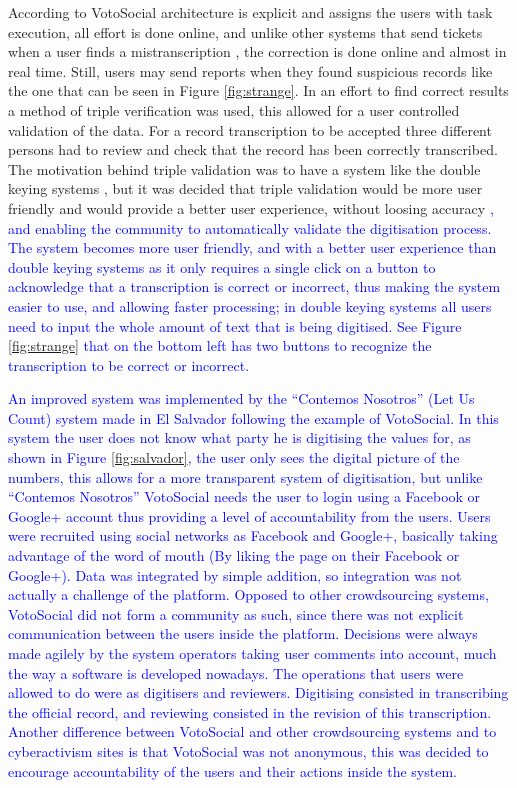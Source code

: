 \documentclass[letterpaper,10pt]{article}
\begin{document}
According to \cite{doan2011} VotoSocial architecture is explicit and assigns the users with task execution, all effort is done online, and unlike other systems that send tickets when a user finds a mistranscription \citep{haaf2013}, the correction is done online and almost in real time. Still, users may send reports when they found suspicious records like the one that can be seen in Figure \ref{fig:strange}. In an effort to find correct results a method of triple verification was used, this allowed for a user controlled validation of the data. For a record transcription to be accepted three different persons had to review and check that the record has been correctly transcribed. The motivation behind triple validation was to have a system like the double keying systems \citep{haaf2013}, but it was decided that triple validation would be more user friendly and would provide a better user experience, without loosing accuracy \textcolor{blue}{, and enabling the community to automatically validate the digitisation process. The system becomes more user friendly, and with a better user experience than double keying systems as it only requires a single click on a button to acknowledge that a transcription is correct or incorrect, thus making the system easier to use, and allowing faster processing; in double keying systems all users need to input the whole amount of text that is being digitised. See Figure \ref{fig:strange} that on the bottom left has two buttons to recognize the transcription to be correct or incorrect.}

\textcolor{blue}{An improved system was implemented by the ``Contemos Nosotros'' (Let Us Count) \citep{contemosnosotros} system made in El Salvador following the example of VotoSocial. In this system the user does not know what party he is digitising the values for, as shown in Figure \ref{fig:salvador}, the user only sees the digital picture of the numbers, this allows for a more transparent system of digitisation, but unlike ``Contemos Nosotros'' VotoSocial needs the user to login using a Facebook or Google+ account thus providing a level of accountability from the users. Users were recruited using social networks as Facebook and Google+, basically taking advantage of the word of mouth (By liking the page on their Facebook or Google+). Data was integrated by simple addition, so integration was not actually a challenge of the platform. Opposed to other crowdsourcing systems, VotoSocial did not form a community as such, since there was not explicit communication between the users inside the platform. Decisions were always made agilely by the system operators taking user comments into account, much the way a software is developed nowadays. The operations that users were allowed to do were as digitisers and reviewers. Digitising consisted in transcribing the official record, and reviewing consisted in the revision of this transcription. Another difference between VotoSocial and other crowdsourcing systems and to cyberactivism sites is that VotoSocial was not anonymous, this was decided to encourage accountability of the users and their actions inside the system. }
\end{document}
